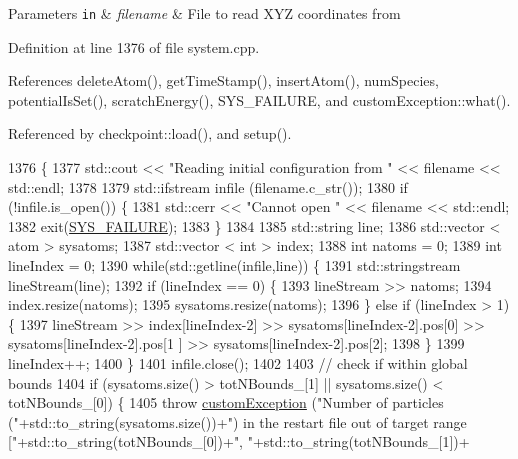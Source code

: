 \begin{DoxyParams}[1]{Parameters}
\mbox{\tt in}  & {\em filename} & File to read X\-Y\-Z coordinates from \\
\hline
\end{DoxyParams}


Definition at line 1376 of file system.\-cpp.



References delete\-Atom(), get\-Time\-Stamp(), insert\-Atom(), num\-Species, potential\-Is\-Set(), scratch\-Energy(), S\-Y\-S\-\_\-\-F\-A\-I\-L\-U\-R\-E, and custom\-Exception\-::what().



Referenced by checkpoint\-::load(), and setup().


\begin{DoxyCode}
1376                                               \{
1377     std::cout << \textcolor{stringliteral}{"Reading initial configuration from "} << filename << std::endl;
1378 
1379     std::ifstream infile (filename.c\_str());
1380     \textcolor{keywordflow}{if} (!infile.is\_open()) \{
1381         std::cerr << \textcolor{stringliteral}{"Cannot open "} << filename << std::endl;
1382         exit(\hyperlink{global_8h_a428dfe1ef0a6ff4b1fdebf275f6aff2e}{SYS\_FAILURE});
1383     \}
1384 
1385     std::string line;
1386     std::vector < atom > sysatoms;
1387     std::vector < int > index;
1388     \textcolor{keywordtype}{int} natoms = 0;
1389     \textcolor{keywordtype}{int} lineIndex = 0;
1390     \textcolor{keywordflow}{while}(std::getline(infile,line)) \{
1391         std::stringstream lineStream(line);
1392         \textcolor{keywordflow}{if} (lineIndex == 0) \{
1393             lineStream >> natoms;
1394             index.resize(natoms);
1395             sysatoms.resize(natoms);
1396         \} \textcolor{keywordflow}{else} \textcolor{keywordflow}{if} (lineIndex > 1) \{
1397             lineStream >> index[lineIndex-2] >> sysatoms[lineIndex-2].pos[0] >> sysatoms[lineIndex-2].pos[1
      ] >> sysatoms[lineIndex-2].pos[2];
1398         \}
1399         lineIndex++;
1400     \}
1401     infile.close();
1402 
1403     \textcolor{comment}{// check if within global bounds}
1404     \textcolor{keywordflow}{if} (sysatoms.size() > totNBounds\_[1] || sysatoms.size() < totNBounds\_[0]) \{
1405         \textcolor{keywordflow}{throw} \hyperlink{classcustom_exception}{customException} (\textcolor{stringliteral}{"Number of particles ("}+std::to\_string(sysatoms.size())+\textcolor{stringliteral}{") in
       the restart file out of target range ["}+std::to\_string(totNBounds\_[0])+\textcolor{stringliteral}{", "}+std::to\_string(totNBounds\_[1])+\textcolor{stringliteral}{
}
\end{DoxyCode}
